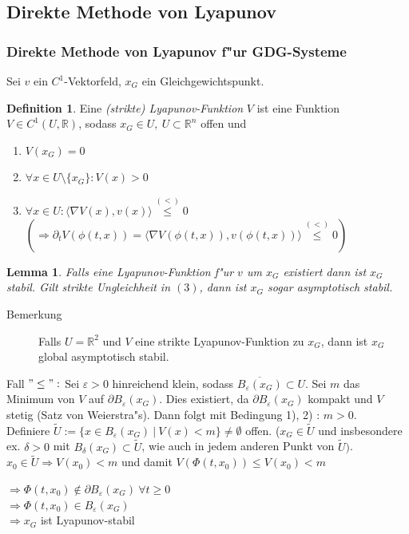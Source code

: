 \documentclass[a4paper, 13pt]{scrreprt}
\newtheorem{lemma}[theorem]{Lemma}
\theoremstyle{definition} \newtheorem{definition}{Definition}[section]
\newenvironment{beweis}[1][Beweis]{\begin{trivlist}
\item[\hskip \labelsep {\bfseries #1}]}{\end{trivlist}}
\newcommand{\RR}{\mathbb{R}}
\begin{document}
\subsection{Direkte Methode von Lyapunov}
\subsubsection{Direkte Methode von Lyapunov f"ur GDG-Systeme}
Sei $v$ ein $C^1$-Vektorfeld, $x_G$ ein Gleichgewichtspunkt.
\begin{definition}
Eine \emph{(strikte) Lyapunov-Funktion} $V$ ist eine Funktion $V \in C^1(U, \mathbb{R})$, sodass $x_G \in U, \ U\subset \mathbb{R}^n$ offen und 
\begin{enumerate}
\item $V(x_G) = 0$
\item $\forall x \in U\setminus \{x_G\}: V(x) > 0$
\item $\forall x \in U: \langle \nabla V(x), v(x) \rangle \stackrel{(<)}\leq 0$ \\
				\(( \Rightarrow \partial_t V(\phi(t,x)) = \langle \nabla V(\phi(t,x)), v(\phi(t,x)) \rangle \stackrel{(<)}\leq 0 )\)
\end{enumerate}
\end{definition}

\begin{lemma}
Falls eine Lyapunov-Funktion f"ur $v$ um $x_G$ existiert dann ist $x_G$ stabil. Gilt strikte Ungleichheit in $(3)$, dann ist $x_G$ sogar asymptotisch stabil.
\end{lemma}

\begin{description}
\item[Bemerkung]
Falls \( U = \RR^2 \) und \(V\) eine strikte Lyapunov-Funktion zu \(x_G\), dann ist \(x_G\) global asymptotisch stabil.
\end{description}

\begin{beweis} 
Fall \("\leq" : \) \newline
Sei \(\varepsilon > 0\) hinreichend klein, sodass \(\overline{B_{\varepsilon} (x_G)} \subset U\). Sei \(m\) das Minimum von \(V\) auf \(\partial B_{\varepsilon} (x_G) \). Dies existiert, da \(\partial B_{\varepsilon} (x_G) \) kompakt und \(V\) stetig (Satz von Weierstra"s). Dann folgt mit Bedingung 1), 2) : \(m > 0\). \\
Definiere \( \tilde{U} := \{ x \in B_{\varepsilon} (x_G)\ |\ V(x) < m \} \not= \emptyset \) offen. (\(x_G \in \tilde{U}\) und insbesondere ex. \(\delta > 0 \) mit \(B_{\delta} (x_G) \subset \tilde{U} \), wie auch in jedem anderen Punkt von \(\tilde{U})\). \\
\(x_0 \in \tilde{U} \Rightarrow V(x_0) < m \) und damit \(V(\Phi(t,x_0)) \leq V(x_0) < m \)
\begin{addmargin}[38pt]{0pt}
	\(\Rightarrow \Phi(t,x_0) \notin \partial B_{\varepsilon} (x_G)\  \forall t \geq 0 \) \\
	\(\Rightarrow \Phi(t,x_0) \in B_{\varepsilon} (x_G) \) \\
	\(\Rightarrow x_G  \) ist Lyapunov-stabil
\end {addmargin}
\end{beweis}
\end{document}
